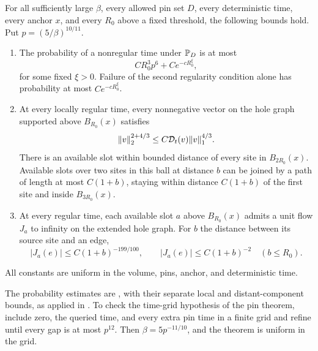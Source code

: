 \begin{proposition}\label{prop:geometryinputs}
For all sufficiently large $\beta$, every allowed pin set $D$, every
deterministic time, every anchor $x$, and every $R_0$ above a fixed
threshold, the following bounds hold.  Put $p=(5/\beta)^{10/11}$.
\begin{enumerate}
\item The probability of a nonregular time under $\mathbb P_D$ is at most
\begin{equation}\label{eq:regularityprob}
 C R_0^3p^6+C e^{-cR_0^\xi},
\end{equation}
for some fixed $\xi>0$.  Failure of the second regularity condition
alone has probability at most $C e^{-cR_0^\xi}$.
\item At every locally regular time, every nonnegative vector on the
hole graph supported above $B_{R_0}(x)$ satisfies
\begin{equation}\label{eq:nash}
 \lVert v\rVert_2^{2+4/3}\le C\mathcal D_t(v)\lVert v\rVert_1^{4/3}.
\end{equation}
There is an available slot within bounded distance of every site in
$B_{2R_0}(x)$.  Available slots over two sites in this ball at distance
$b$ can be joined by a path of length at most $C(1+b)$, staying within
distance $C(1+b)$ of the first site and inside $B_{3R_0}(x)$.
\item At every regular time, each available slot $a$ above $B_{R_0}(x)$
admits a unit flow $J_a$ to infinity on the extended hole graph.
For $b$ the distance between its source site and an edge,
\begin{equation}\label{eq:flowenvelopes}
 |J_a(e)|\le C(1+b)^{-199/100},
 \qquad |J_a(e)|\le C(1+b)^{-2}\quad(b\le R_0).
\end{equation}
\end{enumerate}
All constants are uniform in the volume, pins, anchor, and deterministic
time.
\end{proposition}

The probability estimates are
\cite[Proposition~5.4 and Theorem~7.5]{Ordering}, with their separate
local and distant-component bounds, as applied in
\cite[Proposition~4.3]{BlochLaw}.  To check the time-grid hypothesis of the
pin theorem, include zero, the queried time, and every extra pin time
in a finite grid and refine until every gap is at most $p^{12}$.
Then $\beta=5p^{-11/10}$, and the theorem is uniform in the grid.

